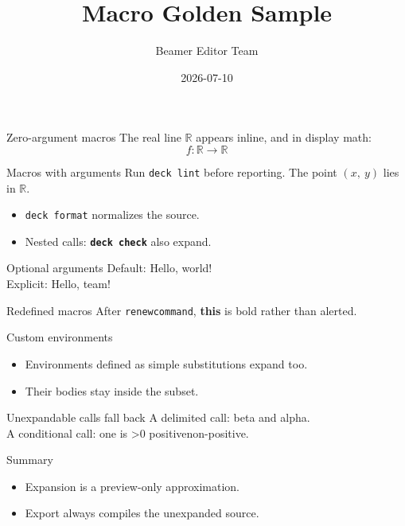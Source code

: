\documentclass[aspectratio=169]{beamer}
\title{Macro Golden Sample}
\author{Beamer Editor Team}
\date{2026-07-10}
\newcommand{\R}{\mathbb{R}}
\newcommand{\code}[1]{\texttt{#1}}
\newcommand{\pair}[2]{\left(#1,\ #2\right)}
\newcommand{\greet}[1][world]{Hello, #1!}
\newcommand{\highlight}[1]{\alert{#1}}
\renewcommand{\highlight}[1]{\textbf{#1}}
\newcommand{\maybe}[1]{\ifnum#1>0 positive\else non-positive\fi}
\newenvironment{keypoints}{\begin{itemize}}{\end{itemize}}
\def\swap(#1,#2){#2 and #1}
\begin{document}
\begin{frame}
  \titlepage
\end{frame}

\begin{frame}{Zero-argument macros}
  The real line $\R$ appears inline, and in display math:
  \[
    f \colon \R \to \R
  \]
\end{frame}

\begin{frame}{Macros with arguments}
  Run \code{deck lint} before reporting. The point $\pair{x}{y}$ lies in $\R$.
  \begin{itemize}
    \item \code{deck format} normalizes the source.
    \item Nested calls: \code{\highlight{deck check}} also expand.
  \end{itemize}
\end{frame}

\begin{frame}{Optional arguments}
  Default: \greet\\
  Explicit: \greet[team]
\end{frame}

\begin{frame}{Redefined macros}
  After \texttt{renewcommand}, \highlight{this} is bold rather than alerted.
\end{frame}

\begin{frame}{Custom environments}
  \begin{keypoints}
    \item Environments defined as simple substitutions expand too.
    \item Their bodies stay inside the subset.
  \end{keypoints}
\end{frame}

\begin{frame}{Unexpandable calls fall back}
  A delimited call: \swap(alpha,beta).\\
  A conditional call: one is \maybe{1}.
\end{frame}

\begin{frame}{Summary}
  \begin{itemize}
    \item Expansion is a preview-only approximation.
    \item Export always compiles the unexpanded source.
  \end{itemize}
\end{frame}
\end{document}

